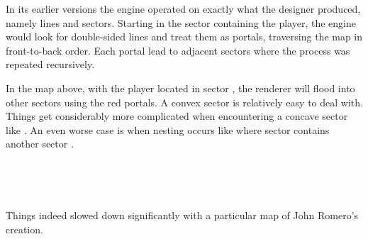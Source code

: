 In its earlier versions the engine operated on exactly what the designer produced, namely lines and sectors. Starting in the sector containing the player, the engine would look for double-sided lines and treat them as portals, traversing the map in front-to-back order. Each portal lead to adjacent sectors where the process was repeated recursively.\\
\par
{}
\par
\vspace{4mm}
In the map above, with the player located in sector , the renderer will flood into other sectors using the red portals. A convex sector  is relatively easy to deal with. Things get considerably more complicated when encountering a concave sector like . An even worse case is when nesting occurs like where sector  contains another sector .\\
\par
{}\\
\par
{}\\
\par
Things indeed slowed down significantly with a particular map of John Romero's creation.




